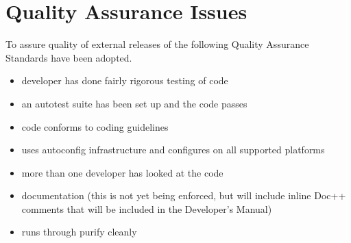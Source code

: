 \chapter{Quality Assurance Issues}
\label{Quality Assurance Issues}

To assure quality of external releases of \hypre{} the following Quality
Assurance Standards have been adopted.  
\begin{itemize}

\item developer has done fairly rigorous testing of code

\item an autotest suite has been set up and the code passes

\item code conforms to coding guidelines

\item uses autoconfig infrastructure and configures on all supported
platforms

\item more than one developer has looked at the code

\item documentation (this is not yet being enforced, but will include
inline Doc++ comments that will be included in the Developer's Manual)

\item runs through purify cleanly

\end{itemize}

